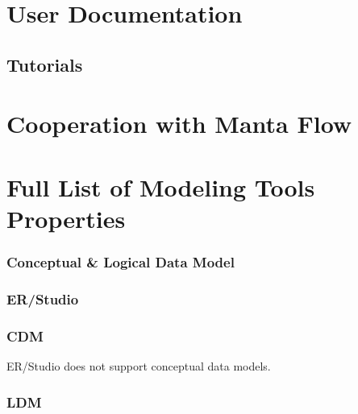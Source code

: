 \documentclass[12pt,a4paper]{report}
\begin{document}
\section{User Documentation}

\subsection{Tutorials}

\section{Cooperation with Manta Flow}

\section{Full List of Modeling Tools Properties}

\subsubsection{Conceptual \& Logical Data Model}

\subsubsection{ER/Studio}

\subsubsection{CDM}

ER/Studio does not support conceptual data models.

\subsubsection{LDM}
\end{document}
